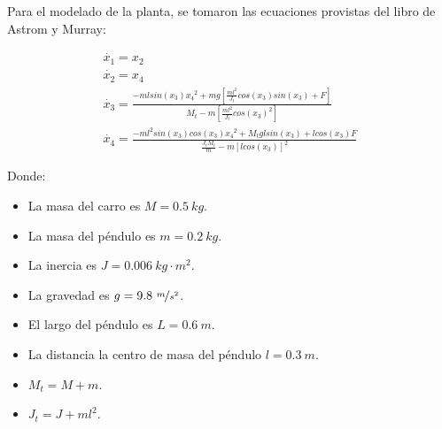 %
%
%

Para el modelado de la planta, se tomaron las ecuaciones provistas del libro de Astrom y Murray:


\begin{equation}
\label{eq:aym}
\begin{gathered}
	\dot{x_1} = x_2
	\\
	\dot{x_2} = x_4
	\\
	\dot{x_3} = \frac{-m l sin(x_3) {x_4}^2 + mg \left[ \frac{m l^2}{J_t} cos(x_3) sin(x_3) + F \right] }{M_t - m \left[ \frac{m l^2}{J_t} {cos(x_3)}^2 \right]}
	\\
	\dot{x_4} = \frac{-m l^2 sin(x_3) cos(x_3) {x_4}^2 + M_t g l sin(x_3) + l cos(x_3) F}{\frac{J_t M_t}{m} - m \left[l cos(x_3)\right]^2}
\end{gathered}
\end{equation}

Donde:
\begin{multicols}{2}
\begin{itemize}
	\item La masa del carro es $M = 0.5 \ kg$.
	\item La masa del péndulo es $m = 0.2 \ kg$.
	\item La inercia es $J = 0.006 \ kg \cdot m^2$.
	\item La gravedad es $g = 9.8 \ \nicefrac{m}{s^2}$.
	\item El largo del péndulo es $L = 0.6 \ m$.
	\item La distancia la centro de masa del péndulo $l = 0.3 \ m$.
	\item $M_t = M + m$.
	\item $J_t = J + m l^2$.
\end{itemize}
\end{multicols}

